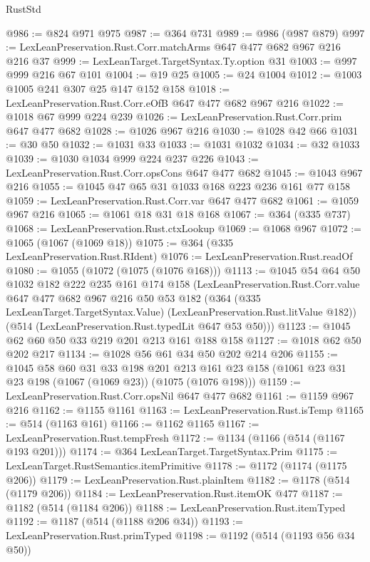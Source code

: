 \begin{lexlean}{RustStd}
\begin{coremodule}
@986 := @824 @971 @975
@987 := @364 @731
@989 := @986 (@987 @879)
@997 := LexLeanPreservation.Rust.Corr.matchArms @647 @477 @682 @967 @216 @216 @37
@999 := LexLeanTarget.TargetSyntax.Ty.option @31
@1003 := @997 @999 @216 @67 @101
@1004 := @19 @25
@1005 := @24 @1004
@1012 := @1003 @1005 @241 @307 @25 @147 @152 @158
@1018 := LexLeanPreservation.Rust.Corr.eOfB @647 @477 @682 @967 @216
@1022 := @1018 @67 @999 @224 @239
@1026 := LexLeanPreservation.Rust.Corr.prim @647 @477 @682
@1028 := @1026 @967 @216
@1030 := @1028 @42 @66
@1031 := @30 @50
@1032 := @1031 @33
@1033 := @1031 @1032
@1034 := @32 @1033
@1039 := @1030 @1034 @999 @224 @237 @226
@1043 := LexLeanPreservation.Rust.Corr.opsCons @647 @477 @682
@1045 := @1043 @967 @216
@1055 := @1045 @47 @65 @31 @1033 @168 @223 @236 @161 @77 @158
@1059 := LexLeanPreservation.Rust.Corr.var @647 @477 @682
@1061 := @1059 @967 @216
@1065 := @1061 @18 @31 @18 @168
@1067 := @364 (@335 @737)
@1068 := LexLeanPreservation.Rust.ctxLookup
@1069 := @1068 @967
@1072 := @1065 (@1067 (@1069 @18))
@1075 := @364 (@335 LexLeanPreservation.Rust.RIdent)
@1076 := LexLeanPreservation.Rust.readOf
@1080 := @1055 (@1072 (@1075 (@1076 @168)))
@1113 := @1045
    @54
    @64
    @50
    @1032
    @182
    @222
    @235
    @161
    @174
    @158
    (LexLeanPreservation.Rust.Corr.value
      @647
      @477
      @682
      @967
      @216
      @50
      @53
      @182
      (@364 (@335 LexLeanTarget.TargetSyntax.Value) (LexLeanPreservation.Rust.litValue @182))
      (@514 (LexLeanPreservation.Rust.typedLit @647 @53 @50)))
@1123 := @1045 @62 @60 @50 @33 @219 @201 @213 @161 @188 @158
@1127 := @1018 @62 @50 @202 @217
@1134 := @1028 @56 @61 @34 @50 @202 @214 @206
@1155 := @1045
    @58
    @60
    @31
    @33
    @198
    @201
    @213
    @161
    @23
    @158
    (@1061 @23 @31 @23 @198 (@1067 (@1069 @23)) (@1075 (@1076 @198)))
@1159 := LexLeanPreservation.Rust.Corr.opsNil @647 @477 @682
@1161 := @1159 @967 @216
@1162 := @1155 @1161
@1163 := LexLeanPreservation.Rust.isTemp
@1165 := @514 (@1163 @161)
@1166 := @1162 @1165
@1167 := LexLeanPreservation.Rust.tempFresh
@1172 := @1134 (@1166 (@514 (@1167 @193 @201)))
@1174 := @364 LexLeanTarget.TargetSyntax.Prim
@1175 := LexLeanTarget.RustSemantics.itemPrimitive
@1178 := @1172 (@1174 (@1175 @206))
@1179 := LexLeanPreservation.Rust.plainItem
@1182 := @1178 (@514 (@1179 @206))
@1184 := LexLeanPreservation.Rust.itemOK @477
@1187 := @1182 (@514 (@1184 @206))
@1188 := LexLeanPreservation.Rust.itemTyped
@1192 := @1187 (@514 (@1188 @206 @34))
@1193 := LexLeanPreservation.Rust.primTyped
@1198 := @1192 (@514 (@1193 @56 @34 @50))

\end{coremodule}
\end{lexlean}
